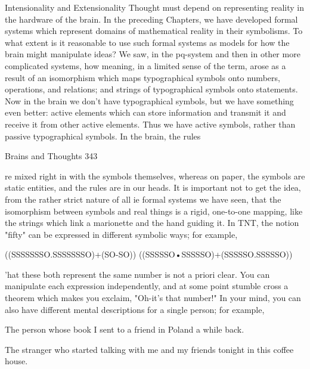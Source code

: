                         Intensionality and Extensionality
Thought must depend on representing reality in the hardware of the brain. In the
preceding Chapters, we have developed formal systems which represent domains of
mathematical reality in their symbolisms. To what extent is it reasonable to use such
formal systems as models for how the brain might manipulate ideas?
We saw, in the pq-system and then in other more complicated systems, how meaning, in
a limited sense of the term, arose as a result of an isomorphism which maps typographical
symbols onto numbers, operations, and relations; and strings of typographical symbols
onto statements. Now in the brain we don't have typographical symbols, but we have
something even better: active elements which can store information and transmit it and
receive it from other active elements. Thus we have active symbols, rather than passive
typographical symbols. In the brain, the rules




Brains and Thoughts                                                                    343

re mixed right in with the symbols themselves, whereas on paper, the symbols are static
entities, and the rules are in our heads.
It is important not to get the idea, from the rather strict nature of all ie formal systems we
have seen, that the isomorphism between symbols and real things is a rigid, one-to-one
mapping, like the strings which link a marionette and the hand guiding it. In TNT, the
notion "fifty" can be expressed in different symbolic ways; for example,

                           ((SSSSSSSO.SSSSSSSO)+(SO-SO))
                        ((SSSSSO•SSSSSO)+(SSSSSO.SSSSSO))

'hat these both represent the same number is not a priori clear. You can manipulate each
expression independently, and at some point stumble cross a theorem which makes you
exclaim, "Oh-it's that number!"
In your mind, you can also have different mental descriptions for a single person; for
example,

      The person whose book I sent to a friend in Poland a while back.

      The stranger who started talking with me and my friends tonight in this coffee
      house.

